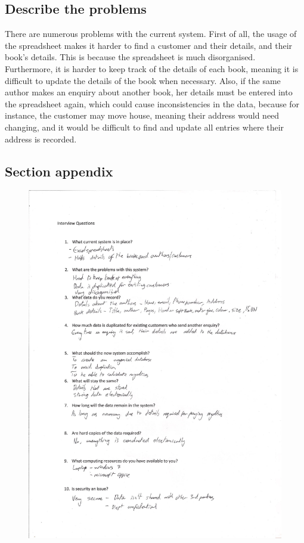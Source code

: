 \subsection{Describe the problems}
There are numerous problems with the current system. First of all, the usage of the spreadsheet makes it harder to find a customer and their details, and their book’s details. This is because the spreadsheet is much disorganised. Furthermore, it is harder to keep track of the details of each book, meaning it is difficult to update the details of the book when necessary. Also, if the same author makes an enquiry about another book, her details must be entered into the spreadsheet again, which could cause inconsistencies in the data, because for instance, the customer may move house, meaning their address would need changing, and it would be difficult to find and update all entries where their address is recorded.

\subsection{Section appendix}
\begin{figure}[H]
    \includegraphics[width=\textwidth]{./Analysis/Interview Questions 1.jpg}
\end{figure}

